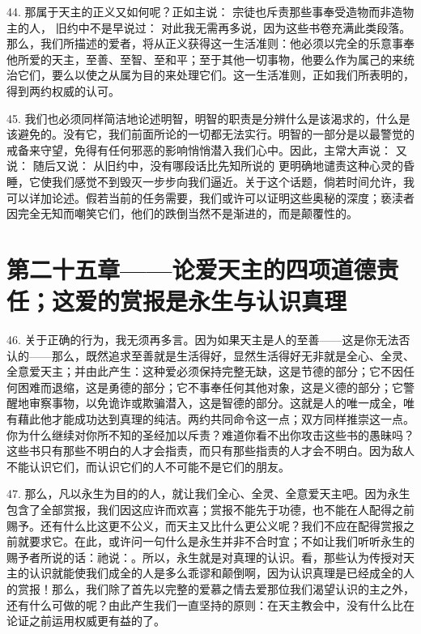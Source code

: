 44. 那属于天主的正义又如何呢？正如主说： 宗徒也斥责那些事奉受造物而非造物主的人， 旧约中不是早说过： 对此我无需再多说，因为这些书卷充满此类段落。那么，我们所描述的爱者，将从正义获得这一生活准则：他必须以完全的乐意事奉他所爱的天主，至善、至智、至和平；至于其他一切事物，他要么作为属己的来统治它们，要么以使之从属为目的来处理它们。这一生活准则，正如我们所表明的，得到两约权威的认可。\par

45. 我们也必须同样简洁地论述明智，明智的职责是分辨什么是该渴求的，什么是该避免的。没有它，我们前面所论的一切都无法实行。明智的一部分是以最警觉的戒备来守望，免得有任何邪恶的影响悄悄潜入我们心中。因此，主常大声说： 又说： 随后又说： 从旧约中，没有哪段话比先知所说的 更明确地谴责这种心灵的昏睡，它使我们感觉不到毁灭一步步向我们逼近。关于这个话题，倘若时间允许，我可以详加论述。假若当前的任务需要，我们或许可以证明这些奥秘的深度；亵渎者因完全无知而嘲笑它们，他们的跌倒当然不是渐进的，而是颠覆性的。\par


\section{第二十五章——论爱天主的四项道德责任；这爱的赏报是永生与认识真理}

46. 关于正确的行为，我无须再多言。因为如果天主是人的至善——这是你无法否认的——那么，既然追求至善就是生活得好，显然生活得好无非就是全心、全灵、全意爱天主；并由此产生：这种爱必须保持完整无缺，这是节德的部分；它不因任何困难而退缩，这是勇德的部分；它不事奉任何其他对象，这是义德的部分；它警醒地审察事物，以免诡诈或欺骗潜入，这是智德的部分。这就是人的唯一成全，唯有藉此他才能成功达到真理的纯洁。两约共同命令这一点；双方同样推崇这一点。你为什么继续对你所不知的圣经加以斥责？难道你看不出你攻击这些书的愚昧吗？这些书只有那些不明白的人才会指责，而只有那些指责的人才会不明白。因为敌人不能认识它们，而认识它们的人不可能不是它们的朋友。\par

47. 那么，凡以永生为目的的人，就让我们全心、全灵、全意爱天主吧。因为永生包含了全部赏报，我们因这应许而欢喜；赏报不能先于功德，也不能在人配得之前赐予。还有什么比这更不公义，而天主又比什么更公义呢？我们不应在配得赏报之前就要求它。在此，或许问一句什么是永生并非不合时宜；不如让我们听听永生的赐予者所说的话：祂说：。所以，永生就是对真理的认识。看，那些认为传授对天主的认识就能使我们成全的人是多么乖谬和颠倒啊，因为认识真理是已经成全的人的赏报！那么，我们除了首先以完整的爱慕之情去爱那位我们渴望认识的主之外，还有什么可做的呢？由此产生我们一直坚持的原则：在天主教会中，没有什么比在论证之前运用权威更有益的了。\par

